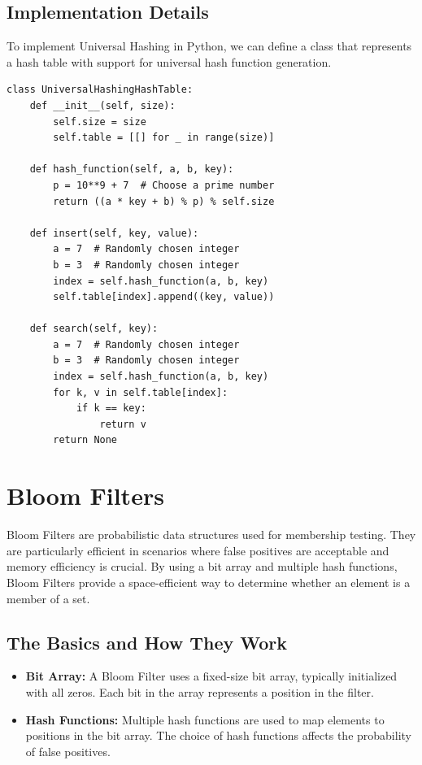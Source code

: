 \documentclass[12pt]{book} %
\begin{document}
\subsection{Implementation Details}

To implement Universal Hashing in Python, we can define a class that represents a hash table with support for universal hash function generation.
\FloatBarrier
\begin{algorithm}[H]
\caption{Universal Hashing Implementation in Python}
\begin{lstlisting}
class UniversalHashingHashTable:
    def __init__(self, size):
        self.size = size
        self.table = [[] for _ in range(size)]

    def hash_function(self, a, b, key):
        p = 10**9 + 7  # Choose a prime number
        return ((a * key + b) % p) % self.size

    def insert(self, key, value):
        a = 7  # Randomly chosen integer
        b = 3  # Randomly chosen integer
        index = self.hash_function(a, b, key)
        self.table[index].append((key, value))

    def search(self, key):
        a = 7  # Randomly chosen integer
        b = 3  # Randomly chosen integer
        index = self.hash_function(a, b, key)
        for k, v in self.table[index]:
            if k == key:
                return v
        return None
\end{lstlisting}
\end{algorithm}
\FloatBarrier

\section{Bloom Filters}
Bloom Filters are probabilistic data structures used for membership testing. They are particularly efficient in scenarios where false positives are acceptable and memory efficiency is crucial. By using a bit array and multiple hash functions, Bloom Filters provide a space-efficient way to determine whether an element is a member of a set.

\subsection{The Basics and How They Work}
\begin{itemize}
    \item \textbf{Bit Array:} A Bloom Filter uses a fixed-size bit array, typically initialized with all zeros. Each bit in the array represents a position in the filter.
    \item \textbf{Hash Functions:} Multiple hash functions are used to map elements to positions in the bit array. The choice of hash functions affects the probability of false positives.
\end{itemize}
\end{document}
